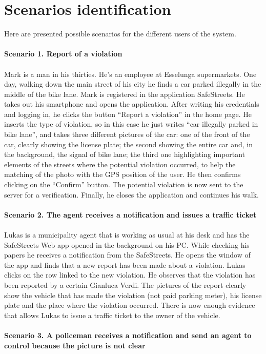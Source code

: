 \documentclass[a4paper]{report}
\begin{document}
\section{Scenarios identification} 
Here are presented possible scenarios for the different users of the system.\\ \\
\textbf{Scenario 1. Report of a violation}\\
\\
Mark is a man in his thirties. He’s an employee at Esselunga supermarkets. One day, walking down the main street of his city he finds a car parked illegally in the middle of the bike lane. Mark is registered in the application SafeStreets. He takes out his smartphone and opens the application. After writing his credentials and logging in, he clicks the button “Report a violation” in the home page. He inserts the type of violation, so in this case he just writes “car illegally parked in bike lane”, and takes three different pictures of the car: one of the front of the car, clearly showing the license plate; the second showing the entire car and, in the background, the signal of bike lane; the third one highlighting important elements of the streets where the potential violation occurred, to help the matching of the photo with the GPS position of the user. He then confirms clicking on the “Confirm” button. The potential violation is now sent to the server for a verification. Finally, he closes the application and continues his walk.
\\
\\ 
\textbf{Scenario 2. The agent receives a notification and issues a traffic ticket}\\
\\
Lukas is a municipality agent that is working as usual at his desk and has the SafeStreets Web app opened in the background on his PC. While checking his papers he receives a notification from the SafeStreets. He opens the window of the app and finds that a new report has been made about a violation. Lukas clicks on the row linked to the new violation. He observes that the violation has been reported by a certain Gianluca Verdi. The pictures of the report clearly show the vehicle that has made the violation (not paid parking meter), his license plate and the place where the violation occurred. There is now enough evidence that allows Lukas to issue a traffic ticket to the owner of the vehicle.
\\
\\
\textbf{Scenario 3. A policeman receives a notification and send an agent to control because the picture is not clear}\\
\end{document}
